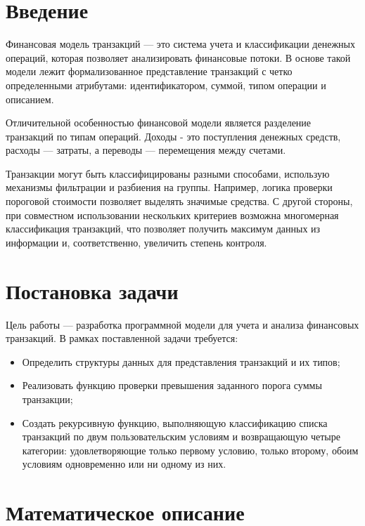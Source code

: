 \documentclass[a4paper, final]{article}
\begin{document}
	\newpage
	
	\tableofcontents
	
	\newpage
	\section*{Введение}
	
	Финансовая модель транзакций — это система учета и классификации денежных операций, которая позволяет анализировать финансовые потоки. В основе такой модели лежит формализованное представление транзакций с четко определенными атрибутами: идентификатором, суммой, типом операции и описанием.
	
	Отличительной особенностью финансовой модели  является разделение транзакций по типам операций. Доходы - это поступления денежных средств, расходы — затраты, а переводы — перемещения между счетами. 
	
	Транзакции могут быть классифицированы разными способами, использую механизмы фильтрации и разбиения на группы. Например, логика проверки пороговой стоимости позволяет выделять значимые средства. С другой стороны, при совместном использовании нескольких критериев возможна многомерная классификация транзакций, что позволяет получить максимум данных из информации и, соответственно, увеличить степень контроля.
	
	
	
	\newpage
	\section*{Постановка задачи}
	\par Цель работы — разработка программной модели для учета и анализа финансовых транзакций. В рамках поставленной задачи требуется:
	\begin{itemize}
		\item Определить структуры данных для представления транзакций и их типов;
		\item Реализовать функцию проверки превышения заданного порога суммы транзакции;
		\item Создать рекурсивную функцию, выполняющую классификацию списка транзакций по двум пользовательским условиям и возвращающую четыре категории: удовлетворяющие только первому условию, только второму, обоим условиям одновременно или ни одному из них.
	\end{itemize}
	
	
	\newpage
	\section{ Математическое описание}
	
\end{document}
